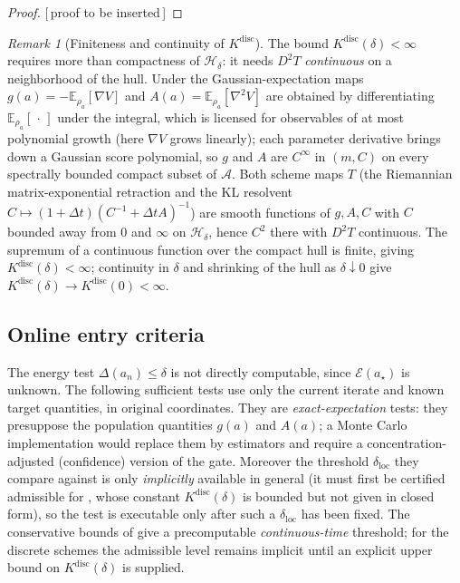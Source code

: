 \documentclass[11pt]{article}
\theoremstyle{plain}
\theoremstyle{definition}
\theoremstyle{remark}
\newtheorem{remark}[remark]{Remark}
\newcommand{\E}{\mathbb{E}}
\newcommand{\calE}{\mathcal{E}}
\newcommand{\Aspace}{\mathcal{A}}
\newcommand{\Hreg}{\mathcal{H}}
\newcommand{\Kdisc}{K^{\mathrm{disc}}}
\newcommand{\PROOFHOLE}{{\color{red}\textsf{[\,proof to be inserted\,]}}}
\begin{document}
\begin{proof}
\PROOFHOLE
\end{proof}

\begin{remark}[Finiteness and continuity of $\Kdisc$]
\label{rem:Kdisc-finite}
The bound $\Kdisc(\delta)<\infty$ requires more than compactness of $\Hreg_\delta$: it needs
$D^2T$ \emph{continuous} on a neighborhood of the hull. Under  the
Gaussian-expectation maps $g(a)=-\E_{\rho_a}[\nabla V]$ and $A(a)=\E_{\rho_a}[\nabla^2V]$ are obtained
by differentiating $\E_{\rho_a}[\,\cdot\,]$ under the integral, which is licensed for observables of at
most polynomial growth (here $\nabla V$ grows linearly); each parameter derivative brings down a
Gaussian score polynomial, so $g$ and $A$ are $C^\infty$ in $(m,C)$ on every spectrally bounded compact
subset of $\Aspace$. Both scheme maps $T$ (the Riemannian matrix-exponential retraction and the KL
resolvent $C\mapsto(1+\Delta t)(C^{-1}+\Delta t A)^{-1}$) are smooth functions of $g,A,C$ with $C$
bounded away from $0$ and $\infty$ on $\Hreg_\delta$, hence $C^2$ there with $D^2T$ continuous. The
supremum of a continuous function over the compact hull is finite, giving $\Kdisc(\delta)<\infty$;
continuity in $\delta$ and shrinking of the hull as $\delta\downarrow0$ give
$\Kdisc(\delta)\to\Kdisc(0)<\infty$.
\end{remark}

\subsection{Online entry criteria}
\label{subsec:entry}

The energy test $\Delta(a_n)\leq\delta$ is not directly computable, since $\calE(a_\star)$ is
unknown. The following sufficient tests use only the current iterate and known target quantities,
in original coordinates. They are \emph{exact-expectation} tests: they presuppose the population
quantities $g(a)$ and $A(a)$; a Monte Carlo implementation would replace them by estimators and
require a concentration-adjusted (confidence) version of the gate. Moreover the threshold
$\delta_{\mathrm{loc}}$ they compare against is only \emph{implicitly} available in general (it must
first be certified admissible for , whose constant $\Kdisc(\delta)$ is bounded
but not given in closed form), so the test is executable only after such a $\delta_{\mathrm{loc}}$
has been fixed. The conservative bounds of  give a precomputable
\emph{continuous-time} threshold; for the discrete schemes the admissible level remains implicit
until an explicit upper bound on $\Kdisc(\delta)$ is supplied.
\end{document}
